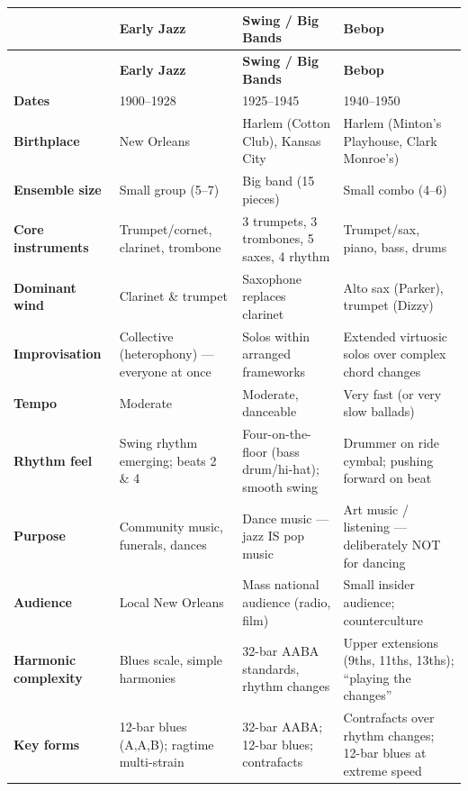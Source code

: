 \documentclass[11pt,letterpaper]{article}
\begin{document}
\renewcommand{\arraystretch}{1.4}
\begin{small}
\begin{longtable}{>{\bfseries}p{2.6cm} p{3.8cm} p{3.8cm} p{3.8cm}}
\toprule
& \textbf{\textcolor{week1color}{Early Jazz}} & \textbf{\textcolor{week2color}{Swing / Big Bands}} & \textbf{\textcolor{week3color}{Bebop}} \\
\midrule
\endfirsthead
\toprule
& \textbf{\textcolor{week1color}{Early Jazz}} & \textbf{\textcolor{week2color}{Swing / Big Bands}} & \textbf{\textcolor{week3color}{Bebop}} \\
\midrule
\endhead
Dates & 1900--1928 & 1925--1945 & 1940--1950 \\
\midrule
Birthplace & New Orleans & Harlem (Cotton Club), Kansas City & Harlem (Minton's Playhouse, Clark Monroe's) \\
\midrule
Ensemble size & Small group (5--7) & Big band (15 pieces) & Small combo (4--6) \\
\midrule
Core instruments & Trumpet/cornet, clarinet, trombone & 3 trumpets, 3 trombones, 5 saxes, 4 rhythm & Trumpet/sax, piano, bass, drums \\
\midrule
Dominant wind & Clarinet \& trumpet & Saxophone replaces clarinet & Alto sax (Parker), trumpet (Dizzy) \\
\midrule
Improvisation & Collective (heterophony) --- everyone at once & Solos within arranged frameworks & Extended virtuosic solos over complex chord changes \\
\midrule
Tempo & Moderate & Moderate, danceable & Very fast (or very slow ballads) \\
\midrule
Rhythm feel & Swing rhythm emerging; beats 2 \& 4 & Four-on-the-floor (bass drum/hi-hat); smooth swing & Drummer on ride cymbal; pushing forward on beat \\
\midrule
Purpose & Community music, funerals, dances & Dance music --- jazz IS pop music & Art music / listening --- deliberately NOT for dancing \\
\midrule
Audience & Local New Orleans & Mass national audience (radio, film) & Small insider audience; counterculture \\
\midrule
Harmonic complexity & Blues scale, simple harmonies & 32-bar AABA standards, rhythm changes & Upper extensions (9ths, 11ths, 13ths); ``playing the changes'' \\
\midrule
Key forms & 12-bar blues (A,A,B); ragtime multi-strain & 32-bar AABA; 12-bar blues; contrafacts & Contrafacts over rhythm changes; 12-bar blues at extreme speed \\

\end{longtable}
\end{small}
\end{document}

